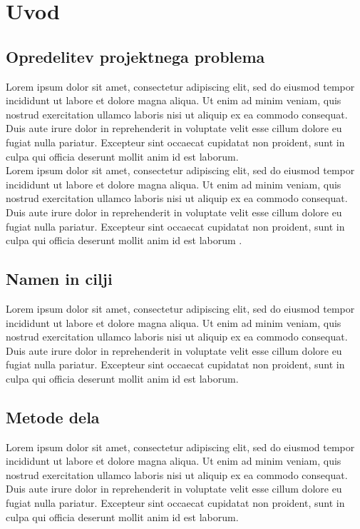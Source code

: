 \section{Uvod}

\subsection{Opredelitev projektnega problema}
Lorem ipsum dolor sit amet, consectetur adipiscing elit, sed do eiusmod tempor incididunt ut labore et dolore magna aliqua. Ut enim ad minim veniam, quis nostrud exercitation ullamco laboris nisi ut aliquip ex ea commodo consequat. Duis aute irure dolor in reprehenderit in voluptate velit esse cillum dolore eu fugiat nulla pariatur. Excepteur sint occaecat cupidatat non proident, sunt in culpa qui officia deserunt mollit anim id est laborum.\\
Lorem ipsum dolor sit amet, consectetur adipiscing elit, sed do eiusmod tempor incididunt ut labore et dolore magna aliqua. Ut enim ad minim veniam, quis nostrud exercitation ullamco laboris nisi ut aliquip ex ea commodo consequat. Duis aute irure dolor in reprehenderit in voluptate velit esse cillum dolore eu fugiat nulla pariatur. Excepteur sint occaecat cupidatat non proident, sunt in culpa qui officia deserunt mollit anim id est laborum \cite{SURS}.

\subsection{Namen in cilji}
Lorem ipsum dolor sit amet, consectetur adipiscing elit, sed do eiusmod tempor incididunt ut labore et dolore magna aliqua. Ut enim ad minim veniam, quis nostrud exercitation ullamco laboris nisi ut aliquip ex ea commodo consequat. Duis aute irure dolor in reprehenderit in voluptate velit esse cillum dolore eu fugiat nulla pariatur. Excepteur sint occaecat cupidatat non proident, sunt in culpa qui officia deserunt mollit anim id est laborum.

\subsection{Metode dela}
Lorem ipsum dolor sit amet, consectetur adipiscing elit, sed do eiusmod tempor incididunt ut labore et dolore magna aliqua. Ut enim ad minim veniam, quis nostrud exercitation ullamco laboris nisi ut aliquip ex ea commodo consequat. Duis aute irure dolor in reprehenderit in voluptate velit esse cillum dolore eu fugiat nulla pariatur. Excepteur sint occaecat cupidatat non proident, sunt in culpa qui officia deserunt mollit anim id est laborum.

